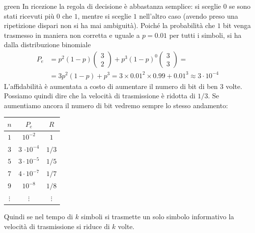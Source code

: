 \begin{mybox}{green}{}
In ricezione la regola di decisione è abbastanza semplice: si sceglie $0$ se sono stati ricevuti più $0$ che $1$, mentre si sceglie $1$ nell'altro caso (avendo preso una ripetizione dispari non si ha mai ambiguità). Poiché la probabilità che $1$ bit venga trasmesso in maniera non corretta e uguale a $p=0.01$ per tutti i simboli, si ha dalla distribuzione binomiale
\begin{align*}
    P_e &= p^2(1-p) \left(
    \begin{array}{c}
      3 \\
      2
    \end{array}
  \right) + p^3(1-p)^0 \left(
    \begin{array}{c}
      3 \\
      3
    \end{array}
  \right) = \\
  &=3p^2(1-p) + p^3 = 3 \times 0.01^2 \times 0.99 + 0.01^3 \approx 3 \cdot 10^{-4}
\end{align*}
L'affidabilità è aumentata a costo di aumentare il numero di bit di ben 3 volte. Possiamo quindi dire che la velocità di trasmissione è ridotta di $1/3$. Se aumentiamo ancora il numero di bit vedremo sempre lo stesso andamento:

\begin{table}[H]
    \centering
    \begin{tabular}{ccc}
    $n$ & $P_e$ & $R$ \\
    \toprule
    $1$ & $10^{-2}$ & $1$ \\
    $3$ & $3$ $\cdot 10^{-4}$ & $1/3$ \\
    $5$ & $3\cdot 10^{-5}$ & $1/5$ \\
    $7$ & $4 \cdot 10^{-7}$ & $1/7$ \\
    $9$ & $10^{-8}$ & $1/8$ \\
    $\vdots$ & $\vdots$ & $\vdots$ \\
    \end{tabular}
    \label{tab:codic}
\end{table}
Quindi se nel tempo di $k$ simboli si trasmette un solo simbolo informativo la velocità di trasmissione si riduce di $k$ volte.
\end{mybox}

